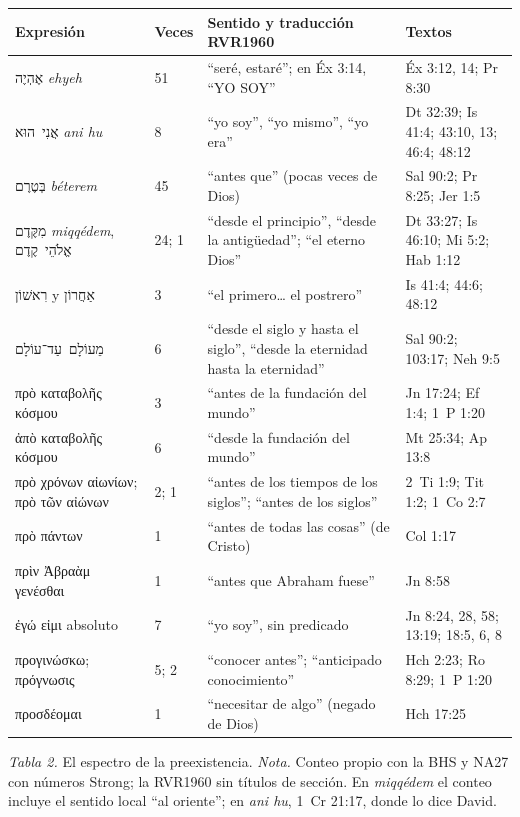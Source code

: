 \documentclass[11pt,letterpaper]{article}
\newcommand{\heb}[1]{\mbox{\foreignlanguage{hebrew}{#1}}}
\newcommand{\grc}[1]{\foreignlanguage{ancientgreek}{#1}}
\begin{document}
\begin{center}\small\renewcommand{\arraystretch}{1.16}
\begin{tabular}{@{}L{3.7cm}L{1.0cm}L{5.4cm}L{4.3cm}@{}}
\toprule
\textbf{Expresión} & \textbf{Veces} & \textbf{Sentido y traducción RVR1960} & \textbf{Textos} \\ \midrule
\heb{אֶהְיֶה} \emph{ehyeh} & 51 & ``seré, estaré''; en Éx 3:14, ``YO SOY'' & Éx 3:12, 14; Pr 8:30 \\
\heb{אֲנִי הוּא} \emph{ani hu} & 8 & ``yo soy'', ``yo mismo'', ``yo era'' & Dt 32:39; Is 41:4; 43:10, 13; 46:4; 48:12 \\
\heb{בְּטֶרֶם} \emph{béterem} & 45 & ``antes que'' (pocas veces de Dios) & Sal 90:2; Pr 8:25; Jer 1:5 \\
\heb{מִקֶּדֶם} \emph{miqqédem}, \heb{אֱלֹהֵי קֶדֶם} & 24; 1 & ``desde el principio'', ``desde la antigüedad''; ``el eterno Dios'' & Dt 33:27; Is 46:10; Mi 5:2; Hab 1:12 \\
\heb{רִאשׁוֹן} y \heb{אַחֲרוֹן} & 3 & ``el primero\ldots{} el postrero'' & Is 41:4; 44:6; 48:12 \\
\heb{מֵעוֹלָם עַד־עוֹלָם} & 6 & ``desde el siglo y hasta el siglo'', ``desde la eternidad hasta la eternidad'' & Sal 90:2; 103:17; Neh 9:5 \\ \midrule
\grc{πρὸ καταβολῆς κόσμου} & 3 & ``antes de la fundación del mundo'' & Jn 17:24; Ef 1:4; 1~P 1:20 \\
\grc{ἀπὸ καταβολῆς κόσμου} & 6 & ``desde la fundación del mundo'' & Mt 25:34; Ap 13:8 \\
\grc{πρὸ χρόνων αἰωνίων}; \grc{πρὸ τῶν αἰώνων} & 2; 1 & ``antes de los tiempos de los siglos''; ``antes de los siglos'' & 2~Ti 1:9; Tit 1:2; 1~Co 2:7 \\
\grc{πρὸ πάντων} & 1 & ``antes de todas las cosas'' (de Cristo) & Col 1:17 \\
\grc{πρὶν Ἀβραὰμ γενέσθαι} & 1 & ``antes que Abraham fuese'' & Jn 8:58 \\
\grc{ἐγώ εἰμι} absoluto & 7 & ``yo soy'', sin predicado & Jn 8:24, 28, 58; 13:19; 18:5, 6, 8 \\
\grc{προγινώσκω}; \grc{πρόγνωσις} & 5; 2 & ``conocer antes''; ``anticipado conocimiento'' & Hch 2:23; Ro 8:29; 1~P 1:20 \\
\grc{προσδέομαι} & 1 & ``necesitar de algo'' (negado de Dios) & Hch 17:25 \\
\bottomrule
\end{tabular}\par
{\footnotesize\color{gris}\textit{Tabla 2.} El espectro de la preexistencia. \textit{Nota.} Conteo propio con la BHS y NA27 con números Strong; la RVR1960 sin títulos de sección. En \emph{miqqédem} el conteo incluye el sentido local ``al oriente''; en \emph{ani hu}, 1~Cr 21:17, donde lo dice David.}
\end{center}
\end{document}
